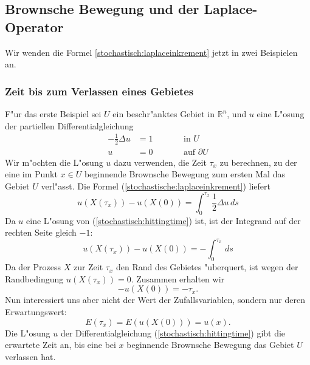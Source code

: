 \subsection{Brownsche Bewegung und der Laplace-Operator}
Wir wenden die Formel \ref{stochastisch:laplaceinkrement} jetzt in
zwei Beispielen an.

\subsubsection{Zeit bis zum Verlassen eines Gebietes}
F"ur das erste Beispiel sei $U$ ein beschr"anktes Gebiet in
$\mathbb R^n$, und $u$ eine L"osung der partiellen Differentialgleichung
\begin{equation}
\begin{aligned}
-\frac12\Delta u&=1&\qquad&\text{in $U$}\\
               u&=0&      &\text{auf $\partial U$}
\end{aligned}
\label{stochastisch:hittingtime}
\end{equation}
Wir m"ochten die L"osung $u$ dazu verwenden, die Zeit $\tau_x$ zu berechnen,
zu der eine im Punkt $x\in U$ beginnende Brownsche Bewegung zum ersten
Mal das Gebiet $U$ verl"asst.
Die Formel (\ref{stochastische:laplaceinkrement}) liefert
\[
u(X(\tau_x))-u(X(0)) = \int_0^{\tau_x} \frac12\Delta u\,ds
\]
Da $u$ eine L"osung von (\ref{stochastisch:hittingtime}) ist, ist der 
Integrand auf der rechten Seite gleich $-1$:
\[
u(X(\tau_x))-u(X(0)) = -\int_0^{\tau_x} \,ds
\]
Da der Prozess $X$ zur Zeit $\tau_x$ den Rand des Gebietes "uberquert,
ist wegen der Randbedingung $u(X(\tau_x))=0$. 
Zusammen erhalten wir
\[
-u(X(0)) = -\tau_x.
\]
Nun interessiert uns aber nicht der Wert der Zufallsvariablen, sondern
nur deren Erwartungswert:
\[
E(\tau_x)=E(u(X(0)))=u(x).
\]
Die L"osung $u$ der Differentialgleichung (\ref{stochastisch:hittingtime})
gibt die erwartete Zeit an, bis eine bei $x$ beginnende Brownsche Bewegung 
das Gebiet $U$ verlassen hat.

